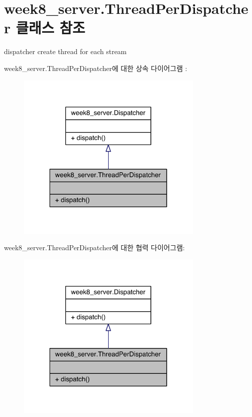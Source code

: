 \hypertarget{classweek8__server_1_1_thread_per_dispatcher}{\section{week8\-\_\-server.\-Thread\-Per\-Dispatcher 클래스 참조}
\label{classweek8__server_1_1_thread_per_dispatcher}
}


dispatcher create thread for each stream  




week8\-\_\-server.\-Thread\-Per\-Dispatcher에 대한 상속 다이어그램 \-: 
\nopagebreak
\begin{figure}[H]
\begin{center}
\leavevmode
\includegraphics[width=256pt]{classweek8__server_1_1_thread_per_dispatcher__inherit__graph}
\end{center}
\end{figure}


week8\-\_\-server.\-Thread\-Per\-Dispatcher에 대한 협력 다이어그램\-:
\nopagebreak
\begin{figure}[H]
\begin{center}
\leavevmode
\includegraphics[width=256pt]{classweek8__server_1_1_thread_per_dispatcher__coll__graph}
\end{center}
\end{figure}
